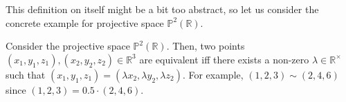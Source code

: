 \documentclass[../../book.tex]{subfiles}
\begin{document}
\vspace{-1.5mm}

This definition on itself might be a bit too abstract, so let us consider the concrete example for projective space $\mathbb{P}^2(\mathbb{R})$.

\begin{example}
    Consider the projective space $\mathbb{P}^2(\mathbb{R})$. Then, two points $(x_1,y_1,z_1),(x_2,y_2,z_2) \in \mathbb{R}^3$ are equivalent iff there exists a non-zero $\lambda \in \mathbb{R}^{\times}$ such that $(x_1,y_1,z_1) = (\lambda x_2, \lambda y_2, \lambda z_2)$. For example, $(1,2,3) \sim (2,4,6)$ since $(1,2,3) = 0.5 \cdot (2,4,6)$.
\end{example}

\vspace{-5mm}
\end{document}
